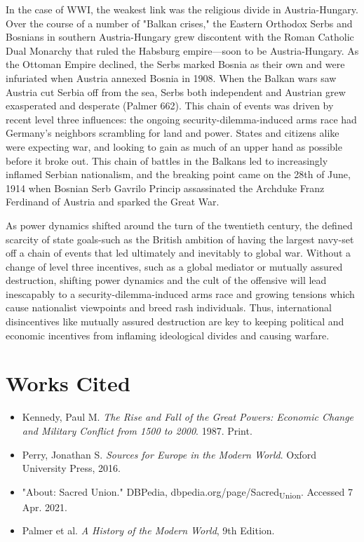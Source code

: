 \documentclass[11pt]{article}
\begin{document}
 \begin{doublespacing}

 In the case of WWI, the weakest link was the religious divide in Austria-Hungary. Over the course of a number of "Balkan crises," the Eastern Orthodox Serbs and Bosnians in southern Austria-Hungary grew discontent with the Roman Catholic Dual Monarchy that ruled the Habsburg empire—soon to be Austria-Hungary. As the Ottoman Empire declined, the Serbs marked Bosnia as their own and were infuriated when Austria annexed Bosnia in 1908. When the Balkan wars saw Austria cut Serbia off from the sea, Serbs both independent and Austrian grew exasperated and desperate (Palmer 662).
 This chain of events was driven by recent level three influences: the ongoing security-dilemma-induced arms race had Germany's neighbors scrambling for land and power. States and citizens alike were expecting war, and looking to gain as much of an upper hand as possible before it broke out.
 This chain of battles in the Balkans led to increasingly inflamed Serbian nationalism, and the breaking point came on the 28th of June, 1914 when Bosnian Serb Gavrilo Princip assassinated the Archduke Franz Ferdinand of Austria and sparked the Great War.

As power dynamics shifted around the turn of the twentieth century, the defined scarcity of state goals-such as the British ambition of having the largest navy-set off a chain of events that led ultimately and inevitably to global war. Without a change of level three incentives, such as a global mediator or mutually assured destruction, shifting power dynamics and the cult of the offensive will lead inescapably to a security-dilemma-induced arms race and growing tensions which cause nationalist viewpoints and breed rash individuals. Thus, international disincentives like mutually assured destruction are key to keeping political and economic incentives from inflaming ideological divides and causing warfare.

\end{doublespacing}

\section{Works Cited}
\label{sec:org2337cfd}

\begin{itemize}
\item Kennedy, Paul M. \emph{The Rise and Fall of the Great Powers: Economic Change and Military Conflict from 1500 to 2000}. 1987. Print.
\item Perry, Jonathan S. \emph{Sources for Europe in the Modern World}. Oxford University Press, 2016.
\item "About: Sacred Union." DBPedia, dbpedia.org/page/Sacred\textsubscript{Union}. Accessed 7 Apr. 2021.
\item Palmer et al. \emph{A History of the Modern World}, 9th Edition.
\end{itemize}
\end{document}
